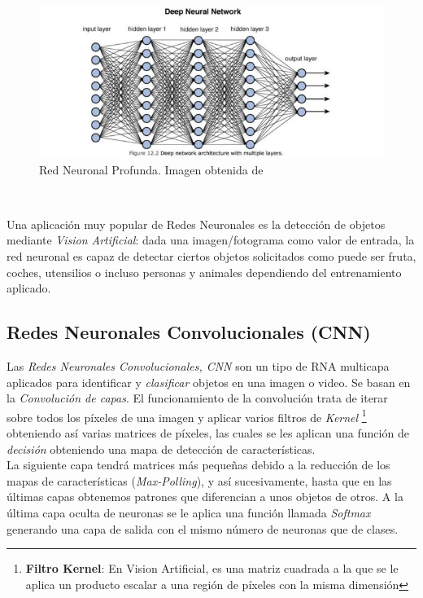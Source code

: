 \begin{figure}[H]
  \begin{center}
    \includegraphics[width=15cm]{imagenes/cap1/dnn.jpeg}
  \end{center}
  \caption[Red Neuronal Profunda (DNN)]{Red Neuronal Profunda. Imagen obtenida de \cite{dnn}}
  \label{fig:salida_perceptron}
\end{figure}\

Una aplicación muy popular de Redes Neuronales es la detección de objetos mediante \textit{Vision Artificial}: dada una imagen/fotograma como valor de entrada, la red neuronal es capaz de detectar ciertos objetos solicitados como puede ser fruta, coches, utensilios o incluso personas y animales dependiendo del entrenamiento aplicado.\\


\subsection{Redes Neuronales Convolucionales (CNN)}
\label{subsec:redes_convolucionales}

Las \textit{Redes Neuronales Convolucionales, CNN} son un tipo de RNA multicapa aplicados para identificar y \textit{clasificar} objetos en una imagen o video. Se basan en la \textit{Convolución de capas}. El funcionamiento de la convolución trata de iterar sobre todos los píxeles de una imagen y aplicar varios filtros de \textit{Kernel} \footnote{\textbf{Filtro Kernel}: En Vision Artificial, es una matriz cuadrada a la que se le aplica un producto escalar a una región de píxeles con la misma dimensión} obteniendo así varias matrices de píxeles, las cuales se les aplican una función de \textit{decisión} obteniendo una mapa de detección de características.\\

La siguiente capa tendrá matrices más pequeñas debido a la reducción de los mapas de características (\textit{Max-Polling}), y así sucesivamente, hasta que en las últimas capas obtenemos patrones que diferencian a unos objetos de otros. A la última capa oculta de neuronas se le aplica una función llamada \textit{Softmax} generando una capa de salida con el mismo número de neuronas que de clases.\\

